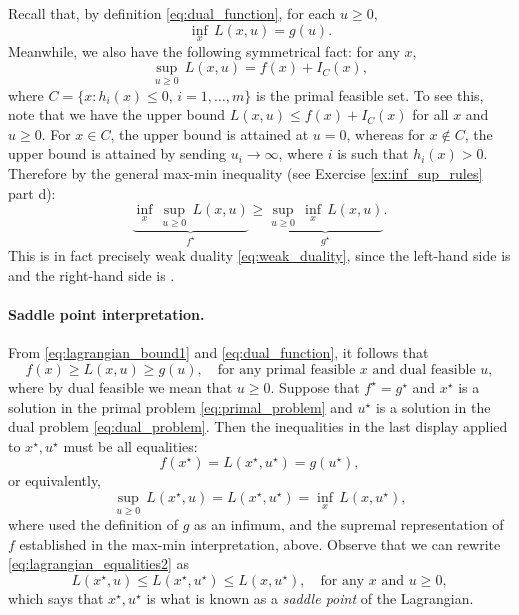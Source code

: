 Recall that, by definition \eqref{eq:dual_function}, for each $u \geq 0$,    
\[
\inf_x \, L(x,u) = g(u).
\]
Meanwhile, we also have the following symmetrical fact: for any $x$, 
\[
\sup_{u \geq 0} \, L(x,u) = f(x) + I_C(x),
\]
where $C = \{x : h_i(x) \leq 0, \, i=1,\dots,m\}$ is the primal feasible
set. To see this, note that we have the upper bound $L(x,u) \leq f(x) +
I_C(x)$ for all $x$ and $u \geq 0$. For $x \in C$, the upper bound is attained   
at $u = 0$, whereas for $x \notin C$, the upper bound is attained by sending 
$u_i \to \infty$, where $i$ is such that $h_i(x) > 0$. Therefore by the general
max-min inequality (see Exercise \ref{ex:inf_sup_rules} part d): 
\[
\underbrace{\inf_x \, \sup_{u \geq 0} \, L(x,u)}_{f^\star} \geq 
\underbrace{\sup_{u \geq 0} \, \inf_x \, L(x,u)}_{g^\star}.
\]
This is in fact precisely weak duality \eqref{eq:weak_duality}, since the 
left-hand side is  and the
right-hand side is . 

\paragraph{Saddle point interpretation.}

From \eqref{eq:lagrangian_bound1} and \eqref{eq:dual_function}, it follows that  
\[
f(x) \geq L(x,u) \geq g(u), \quad \text{for any primal feasible $x$ and dual
  feasible $u$}, 
\]
where by dual feasible we mean that $u \geq 0$. Suppose that $f^\star =
g^\star$ and $x^\star$ is a solution in the primal problem
\eqref{eq:primal_problem} and $u^\star$ is a solution in the dual problem
\eqref{eq:dual_problem}. Then the inequalities in the last display applied to
$x^\star,u^\star$ must be all equalities:  
\begin{equation}
\label{eq:lagrangian_equalities1}
f(x^\star) = L(x^\star, u^\star) = g(u^\star),
\end{equation}
or equivalently, 
\begin{equation}
\label{eq:lagrangian_equalities2}
\sup_{u \geq 0} \, L(x^\star, u) = L(x^\star, u^\star) = \inf_x \, L(x,
u^\star), 
\end{equation}
where used the definition of $g$ as an infimum, and the supremal representation
of $f$ established in the max-min interpretation, above. Observe that we can
rewrite \eqref{eq:lagrangian_equalities2} as
\begin{equation}
\label{eq:lagrangian_saddle_point}
L(x^\star, u) \leq L(x^\star, u^\star) \leq L(x, u^\star), \quad \text{for any
  $x$ and $u \geq 0$},
\end{equation}
which says that $x^\star,u^\star$ is what is known as a \emph{saddle point} of 
the Lagrangian. 

